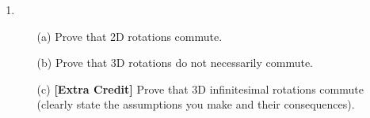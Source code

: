 \begin{enumerate}
\item 
\begin{enumerate}
\item[(a)] Prove that 2D rotations commute.

\vspace{9cm}

\item[(b)] Prove that 3D rotations do not necessarily commute.

\newpage

\item[(c)] \textbf{[Extra Credit]} Prove that 3D infinitesimal rotations commute (clearly state the assumptions you make and their consequences).
\end{enumerate}


\end{enumerate}



